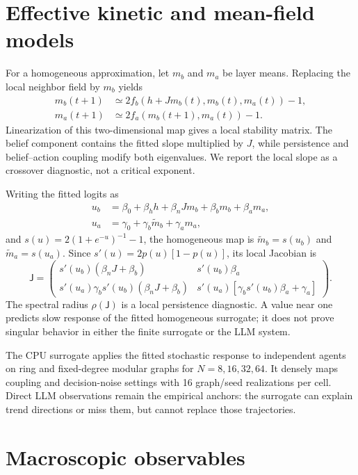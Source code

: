 \documentclass[12pt]{article}
\begin{document}
\section{Effective kinetic and mean-field models}

For a homogeneous approximation, let $m_b$ and $m_a$ be layer means. Replacing
the local neighbor field by $m_b$ yields
\begin{align}
m_b(t+1)&\simeq 2f_b(h+Jm_b(t),m_b(t),m_a(t))-1,\\
m_a(t+1)&\simeq 2f_a(m_b(t+1),m_a(t))-1.
\end{align}
Linearization of this two-dimensional map gives a local stability matrix. The
belief component contains the fitted slope multiplied by $J$, while persistence
and belief--action coupling modify both eigenvalues. We report the local slope
as a crossover diagnostic, not a critical exponent.

Writing the fitted logits as
\begin{align}
u_b&=\beta_0+\beta_hh+\beta_nJm_b+\beta_bm_b+\beta_am_a,\\
u_a&=\gamma_0+\gamma_b\widetilde m_b+\gamma_am_a,
\end{align}
and $s(u)=2(1+e^{-u})^{-1}-1$, the homogeneous map is
$\widetilde m_b=s(u_b)$ and $\widetilde m_a=s(u_a)$. Since
$s'(u)=2p(u)[1-p(u)]$, its local Jacobian is
\begin{equation}
\mathsf J=
\begin{pmatrix}
s'(u_b)(\beta_nJ+\beta_b) & s'(u_b)\beta_a\\
s'(u_a)\gamma_b s'(u_b)(\beta_nJ+\beta_b) &
s'(u_a)[\gamma_b s'(u_b)\beta_a+\gamma_a]
\end{pmatrix}.
\end{equation}
The spectral radius $\rho(\mathsf J)$ is a local persistence diagnostic. A
value near one predicts slow response of the fitted homogeneous surrogate; it
does not prove singular behavior in either the finite surrogate or the LLM
system.

The CPU surrogate applies the fitted stochastic response to independent agents
on ring and fixed-degree modular graphs for $N=8,16,32,64$. It densely maps
coupling and decision-noise settings with 16 graph/seed realizations per cell.
Direct LLM observations remain the empirical anchors: the surrogate can explain
trend directions or miss them, but cannot replace those trajectories.

\section{Macroscopic observables}
\end{document}
